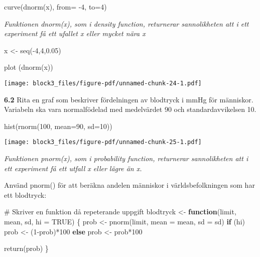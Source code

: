 \documentclass[
  letterpaper,
  DIV=11,
  numbers=noendperiod]{scrartcl}
\newenvironment{Shaded}{\begin{snugshade}}{\end{snugshade}}
\newcommand{\AttributeTok}[1]{\textcolor[rgb]{0.40,0.45,0.13}{#1}}
\newcommand{\CommentTok}[1]{\textcolor[rgb]{0.37,0.37,0.37}{#1}}
\newcommand{\ConstantTok}[1]{\textcolor[rgb]{0.56,0.35,0.01}{#1}}
\newcommand{\ControlFlowTok}[1]{\textcolor[rgb]{0.00,0.23,0.31}{\textbf{#1}}}
\newcommand{\DecValTok}[1]{\textcolor[rgb]{0.68,0.00,0.00}{#1}}
\newcommand{\FloatTok}[1]{\textcolor[rgb]{0.68,0.00,0.00}{#1}}
\newcommand{\FunctionTok}[1]{\textcolor[rgb]{0.28,0.35,0.67}{#1}}
\newcommand{\NormalTok}[1]{\textcolor[rgb]{0.00,0.23,0.31}{#1}}
\newcommand{\OtherTok}[1]{\textcolor[rgb]{0.00,0.23,0.31}{#1}}
\newcommand{\SpecialCharTok}[1]{\textcolor[rgb]{0.37,0.37,0.37}{#1}}
\begin{document}
curve(dnorm(x), from= -4, to=4)

\emph{Funktionen dnorm(x), som i density function, returnerar
sannolikheten att i ett experiment få ett ufallet x eller mycket nära x}

\begin{Shaded}
\begin{Highlighting}[]
\NormalTok{x }\OtherTok{\textless{}{-}} \FunctionTok{seq}\NormalTok{(}\SpecialCharTok{{-}}\DecValTok{4}\NormalTok{,}\DecValTok{4}\NormalTok{,}\FloatTok{0.05}\NormalTok{)}

\FunctionTok{plot}\NormalTok{ (}\FunctionTok{dnorm}\NormalTok{(x))}
\end{Highlighting}
\end{Shaded}

\texttt{[image: block3\_files/figure-pdf/unnamed-chunk-24-1.pdf]}

\textbf{6.2} Rita en graf som beskriver fördelningen av blodtryck i mmHg
för människor. Variabeln ska vara normalfödelad med medelvärdet 90 och
standardavvikelsen 10.

\begin{Shaded}
\begin{Highlighting}[]
\FunctionTok{hist}\NormalTok{(}\FunctionTok{rnorm}\NormalTok{(}\DecValTok{100}\NormalTok{, }\AttributeTok{mean=}\DecValTok{90}\NormalTok{, }\AttributeTok{sd=}\DecValTok{10}\NormalTok{))}
\end{Highlighting}
\end{Shaded}

\texttt{[image: block3\_files/figure-pdf/unnamed-chunk-25-1.pdf]}

\emph{Funktionen pnorm(x), som i probability function, returnerar
sannolikheten att i ett experiment få ett utfall x eller lägre än x.}

Använd pnorm() för att beräkna andelen människor i världsbefolkningen
som har ett blodtryck:

\begin{Shaded}
\begin{Highlighting}[]
\CommentTok{\# Skriver en funktion då repeterande uppgift}
\NormalTok{blodtryck }\OtherTok{\textless{}{-}} \ControlFlowTok{function}\NormalTok{(limit, mean, sd, }\AttributeTok{hi =} \ConstantTok{TRUE}\NormalTok{) \{}
\NormalTok{  prob }\OtherTok{\textless{}{-}} \FunctionTok{pnorm}\NormalTok{(limit, }\AttributeTok{mean =}\NormalTok{ mean, }\AttributeTok{sd =}\NormalTok{ sd)}
  \ControlFlowTok{if}\NormalTok{ (hi)}
\NormalTok{    prob }\OtherTok{\textless{}{-}}\NormalTok{ (}\DecValTok{1}\SpecialCharTok{{-}}\NormalTok{prob)}\SpecialCharTok{*}\DecValTok{100}
  \ControlFlowTok{else}
\NormalTok{    prob }\OtherTok{\textless{}{-}}\NormalTok{ prob}\SpecialCharTok{*}\DecValTok{100}

  \FunctionTok{return}\NormalTok{(prob)}
\NormalTok{\}}
\end{Highlighting}
\end{Shaded}
\end{document}
